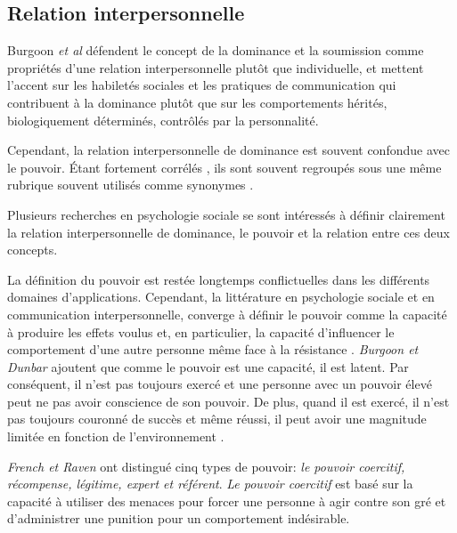 	\subsection{Relation interpersonnelle}
		Burgoon \emph{et al} \cite{burgoon1998nature} défendent le concept de la dominance et la soumission comme propriétés d'une relation interpersonnelle plutôt que individuelle, et mettent l'accent sur les habiletés sociales et les pratiques de communication qui contribuent à la dominance plutôt que sur les comportements hérités, biologiquement déterminés, contrôlés par la personnalité.
		
		Cependant, la relation interpersonnelle de dominance est souvent confondue avec le pouvoir. Étant fortement corrélés \cite{dunbar2005perceptions}, ils sont souvent regroupés sous une même rubrique souvent utilisés comme synonymes  \cite{ellyson1985power,burgoon1998nature}.
		
		Plusieurs recherches en psychologie sociale \cite{burgoon1998nature,dunbar2005perceptions,burgoon2006nonverbal} se sont intéressés à définir clairement la relation interpersonnelle de dominance, le pouvoir et la relation entre ces deux concepts. 
		
		
		La définition du pouvoir est  restée longtemps conflictuelles dans les différents domaines d'applications. Cependant, la littérature en psychologie sociale et en communication interpersonnelle, converge à définir le pouvoir comme la capacité à produire les effets voulus et, en particulier, la capacité d'influencer le comportement d'une autre personne même face à la résistance  \cite{burgoon2000interactionist,burgoon2006nonverbal,huston1983power}.
		\emph{Burgoon et Dunbar} \cite{burgoon1998nature,dunbar2005perceptions} ajoutent que comme le pouvoir est une capacité, il est latent. Par conséquent, il n'est pas toujours exercé et une personne avec un pouvoir élevé peut ne pas avoir conscience de son pouvoir. De plus, quand il est exercé, il n'est pas toujours couronné de succès et même réussi, il peut avoir une magnitude limitée en fonction de l'environnement \cite{huston1983power}.
		
		\emph{French et Raven}\cite{french1959bases} ont distingué cinq types de pouvoir: \textit{le pouvoir coercitif, récompense, légitime, expert et référent}. 
		\textit{Le pouvoir coercitif} est basé sur la capacité à utiliser des menaces pour forcer une personne à agir contre son gré et d'administrer une punition pour un comportement indésirable.
		
